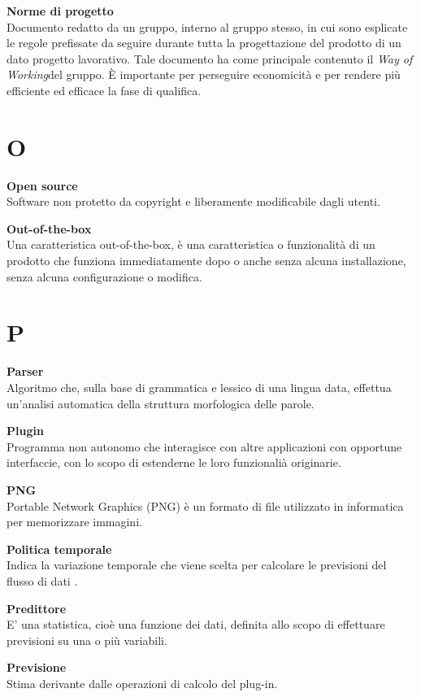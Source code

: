 \documentclass[a4paper, oneside, openany, dvipsnames, table, 12pt]{article}
\begin{document}
\textbf{Norme di progetto} \\
Documento redatto da un gruppo, interno al gruppo stesso, in cui sono esplicate le regole prefissate da seguire durante tutta la progettazione del prodotto di un dato progetto lavorativo. Tale documento ha come principale contenuto il \textit{Way of Working}\glo del gruppo. È importante per perseguire economicità e per rendere più efficiente ed efficace la fase di qualifica.

\newpage
\section{O}
\label{par:opens}
\textbf{Open source} \\
Software non protetto da copyright e liberamente modificabile dagli utenti.

\textbf{Out-of-the-box} \\
Una caratteristica out-of-the-box, è una caratteristica o funzionalità di un prodotto che funziona immediatamente dopo o anche senza alcuna installazione, senza alcuna configurazione o modifica.

\newpage
\section{P}
\textbf{Parser} \\
Algoritmo che, sulla base di grammatica e lessico di una lingua data, effettua un’analisi automatica della struttura morfologica delle parole.

\textbf{Plugin} \\
Programma non autonomo che interagisce con altre applicazioni con opportune interfaccie, con lo scopo di estenderne le loro funzionalià originarie.

\textbf{PNG} \\
Portable Network Graphics (PNG) è un formato di file utilizzato in informatica per memorizzare immagini.

\textbf{Politica temporale} \\
Indica la variazione temporale che viene scelta per calcolare le previsioni del flusso di dati .

\textbf{Predittore} \\
E' una statistica, cioè una funzione dei dati, definita allo scopo di effettuare previsioni su una o più variabili.

\textbf{Previsione} \\
Stima derivante dalle operazioni di calcolo del plug-in.
\end{document}
